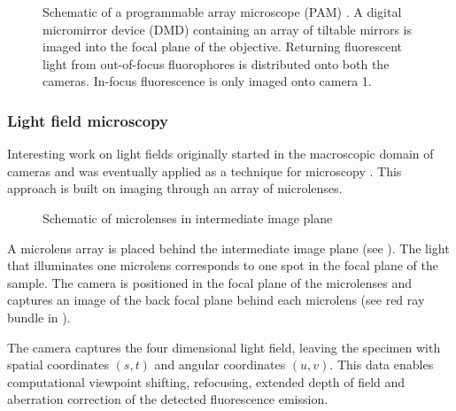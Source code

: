 \begin{figure}[!hbt]
  \centering
  \caption{Schematic of a programmable array microscope (PAM)
    \citep[inspired from][]{Verveer1998}. A digital micromirror
    device (DMD) containing an array of tiltable mirrors is imaged
    into the focal plane of the objective. Returning fluorescent light
    from out-of-focus fluorophores is distributed onto both the
    cameras. In-focus fluorescence is only imaged onto camera 1.}
  \label{fig:pam-sketch}
\end{figure}


%
%
%

\subsubsection{Light field microscopy}
\label{sec:light-field-microscopy}
Interesting work on light fields originally started in the macroscopic
domain of cameras \citep{Lippmann1908%
} and was eventually applied as a technique for microscopy
\citep{Levoy2006,Levoy2009,Zhang2009}. This approach is built on
imaging through an array of microlenses.
\begin{figure}[!hbt]
  \centering
  \caption{Schematic of microlenses in intermediate image plane
    \citep[inspired from][]{Levoy2006}}
  \label{fig:microlens-levoy-sketch}
\end{figure}

A microlens array is placed behind the intermediate image plane (see
). The light that illuminates one
microlens corresponds to one spot in the focal plane of the
sample. The camera is positioned in the focal plane of the microlenses
and captures an image of the back focal plane behind each microlens
(see red ray bundle in ).

The camera captures the four dimensional light field, leaving the
specimen with spatial coordinates $(s,t)$ and angular coordinates
$(u,v)$. This data enables computational viewpoint shifting,
refocusing, extended depth of field and aberration correction of the
detected fluorescence emission.

